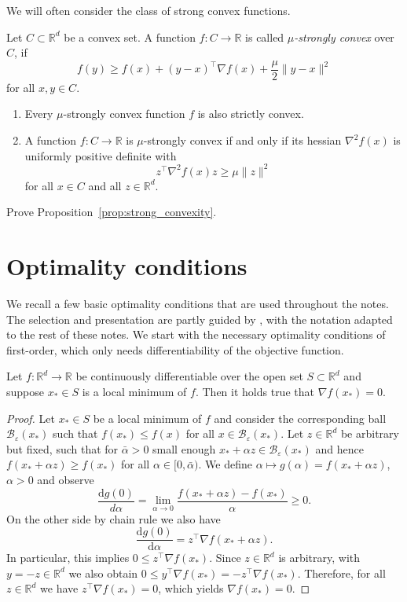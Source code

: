 \documentclass[12pt,openany]{book}
\theoremstyle{definition}
\theoremstyle{definition}
\newcommand{\R}{\mathbb{R}}
\begin{document}
We will often consider the class of strong convex functions.
\begin{defi}\label{def:strong_convexity}
Let $C\subset \R^d$ be a convex set.  A function $f:C\to \R$ is called \textit{$\mu$-strongly convex} over $C$, if 
\[f(y) \ge f(x) + (y-x)^\top \nabla f(x) + \frac{\mu}{2} \|y-x\|^2 \]
for all $x,y\in C$.
\end{defi}
\begin{prop}\label{prop:strong_convexity}
\begin{enumerate}
\item Every $\mu$-strongly convex function $f$ is also strictly convex.
\item A function $f:C\to\R$ is $\mu$-strongly convex if and only if its hessian $\nabla^2 f(x)$ is uniformly positive definite with
\[z^\top \nabla^2f(x) z \ge \mu \|z\|^2 \]
for all $x\in C$ and all $z\in\R^d$.
\end{enumerate}
\end{prop}
\begin{exercise}
Prove Proposition~\ref{prop:strong_convexity}.
\end{exercise}

\section{Optimality conditions}\label{app:op-condition}
We recall a few basic optimality conditions that are used throughout the notes. The selection and
presentation are partly guided by \cite[Section 1.1]{DPB15}, with the notation adapted to the rest of these notes. We start with the necessary optimality conditions of first-order, which only needs differentiability of the objective function.  

\begin{thm}\label{thm:fo_opti}
Let $f:\R^d\to\R$ be continuously differentiable over the open set $S\subset \R^d$ and suppose $x_\ast\in S$ is a local minimum of $f$. Then it holds true that $\nabla f(x_\ast) = 0$.
\end{thm}
\begin{proof}
Let $x_\ast\in S$ be a local minimum of $f$ and consider the corresponding ball $\mathcal B_\varepsilon(x_\ast)$ such that $f(x_\ast)\le f(x)$ for all $x\in\mathcal B_\varepsilon(x_\ast)$. Let $z\in \R^d$ be arbitrary but fixed, such that for $\bar\alpha>0$ small enough $x_\ast+\alpha z\in \mathcal B_\varepsilon(x_\ast)$ and hence $f(x_\ast + \alpha z) \ge f(x_\ast)$ for all $\alpha\in [0,\bar\alpha)$. We define $\alpha \mapsto g(\alpha) = f(x_\ast+ \alpha z)$, $\alpha>0$ and observe 
\[ \frac{{\mathrm d} g(0)}{d \alpha} = \lim_{\alpha\to 0} \frac{f(x_\ast + \alpha z) - f(x_\ast)}{\alpha} \ge 0.\]
On the other side by chain rule we also have
\[\frac{{\mathrm d} g(0)}{{\mathrm d} \alpha} = z^\top \nabla f(x_\ast + \alpha z).\]
In particular, this implies $0\le z^\top \nabla f(x_\ast)$. Since $z\in\R^d$ is arbitrary, with $y=-z\in\R^d$ we also obtain $0\le y^\top \nabla f(x_\ast)=-z^\top \nabla f(x_\ast)$. Therefore, for all $z\in\R^d$ we have $z^\top \nabla f(x_\ast) = 0$, which yields $\nabla f(x_\ast) = 0$.
\end{proof}
\end{document}
